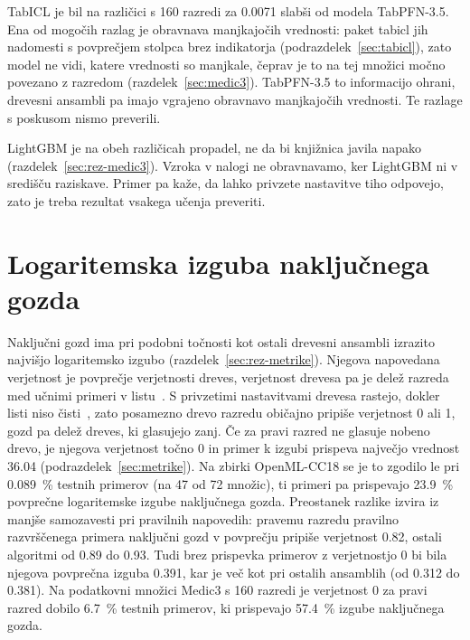 \documentclass[a4paper,12pt,openright]{book}
\begin{document}
TabICL je bil na različici s 160 razredi za \num{0.0071} slabši od modela
TabPFN-3.5. Ena od mogočih razlag je obravnava manjkajočih vrednosti: paket
tabicl jih nadomesti s povprečjem stolpca brez indikatorja
(podrazdelek~\ref{sec:tabicl}), zato model ne vidi, katere vrednosti so
manjkale, čeprav je to na tej množici močno povezano z razredom
(razdelek~\ref{sec:medic3}). TabPFN-3.5 to informacijo ohrani, drevesni
ansambli pa imajo vgrajeno obravnavo manjkajočih vrednosti. Te razlage s poskusom nismo
preverili.

LightGBM je na obeh različicah propadel, ne da bi knjižnica javila napako
(razdelek~\ref{sec:rez-medic3}). Vzroka v nalogi ne obravnavamo, ker LightGBM
ni v središču raziskave. Primer pa kaže, da lahko privzete nastavitve tiho
odpovejo, zato je treba rezultat vsakega učenja preveriti.

\section{Logaritemska izguba naključnega gozda}
\label{sec:disk-rf}

Naključni gozd ima pri podobni točnosti kot ostali drevesni ansambli izrazito
najvišjo logaritemsko izgubo (razdelek~\ref{sec:rez-metrike}). Njegova
napovedana verjetnost je povprečje verjetnosti dreves, verjetnost drevesa pa je
delež razreda med učnimi primeri v listu~\cite{sklearndocsrf}. S privzetimi
nastavitvami drevesa
rastejo, dokler listi niso čisti~\cite{sklearndocsrf}, zato posamezno drevo
razredu običajno pripiše verjetnost 0 ali 1, gozd pa delež dreves, ki glasujejo
zanj. Če za pravi razred ne glasuje nobeno drevo, je njegova verjetnost točno 0
in primer k izgubi prispeva največjo vrednost \num{36.04}
(podrazdelek~\ref{sec:metrike}). Na zbirki OpenML-CC18 se je to zgodilo le pri
\SI{0.089}{\percent} testnih primerov (na 47 od 72 množic), ti primeri pa
prispevajo \SI{23.9}{\percent} povprečne logaritemske izgube naključnega gozda.
Preostanek razlike izvira iz manjše samozavesti pri pravilnih napovedih:
pravemu razredu pravilno razvrščenega primera naključni gozd v povprečju
pripiše verjetnost \num{0.82}, ostali algoritmi od \num{0.89} do \num{0.93}.
Tudi brez prispevka primerov z verjetnostjo 0 bi bila njegova povprečna izguba
\num{0.391}, kar je več kot pri ostalih ansamblih (od \num{0.312} do
\num{0.381}). Na podatkovni množici Medic3 s 160 razredi je verjetnost 0 za
pravi razred dobilo \SI{6.7}{\percent} testnih primerov, ki prispevajo
\SI{57.4}{\percent} izgube naključnega gozda.
\end{document}
